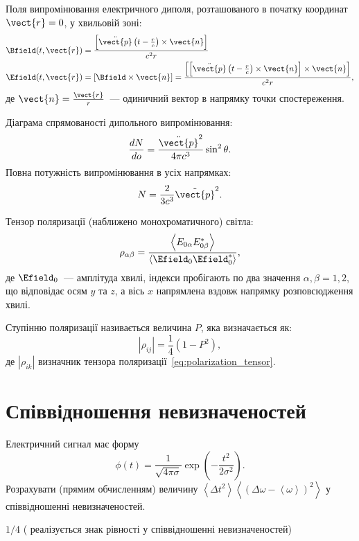 \begin{Theory}
	Поля випромінювання електричного диполя, розташованого в початку координат $\vect{r} = 0$, у хвильовій зоні:
	\begin{align}\label{eq:dipole_radiation}
		\Bfield(t, \vect{r}) & = \frac{\left[ \ddot{\vect{p}}\left(t - \frac{r}{c}\right)\times \vect{n}\right] }{c^2 r}                                                                       \\
		\Efield(t, \vect{r}) & = \left[ \Bfield \times\vect{n}\right] = \frac{\left[ \left[ \ddot{\vect{p}}\left(t - \frac{r}{c}\right)\times \vect{n}\right]\times \vect{n}\right]  }{c^2 r},
	\end{align}
	де $\vect{n} = \frac{\vect{r}}{r}$~--- одиничний вектор в напрямку точки спостереження.

	Діаграма спрямованості дипольного випромінювання:
	\begin{equation}\label{eq:diagram_direction}
		\frac{dN}{do} = \frac{\ddot{\vect{p}}^2}{4\pi c^3}\sin^2\theta.
	\end{equation}
	Повна потужність випромінювання  в усіх напрямках:
	\begin{equation}\label{eq:power}
		N = \frac{2}{3c^3}\ddot{\vect{p}}^2.
	\end{equation}

	Тензор поляризації (наближено монохроматичного) світла:
	\begin{equation}\label{eq:polarization_tensor}
		\rho_{\alpha\beta} = \frac{\left\langle E_{0\alpha} E_{0\beta}^* \right\rangle }{\left\langle \Efield_0\Efield^*_0\right\rangle },
	\end{equation}
	де $\Efield_0$~--- амплітуда хвилі, індекси пробігають по два значення $\alpha,\beta = 1,2$, що відповідає осям $y$ та $z$, а вісь $x$ напрямлена вздовж напрямку розповсюдження хвилі.

	Ступінню поляризації називається величина $P$, яка визначається як:
	\begin{equation}\label{eq:polarization_lewel}
		|\rho_{ij}| = \frac14(1 - P^2),
	\end{equation}
	де $|\rho_{ik}|$ визначник тензора поляризації~\eqref{eq:polarization_tensor}.
\end{Theory}




\section{Співвідношення невизначеностей}

\begin{problem}
Електричний сигнал має форму
\[
	\phi(t) = \frac{1}{\sqrt{4\pi\sigma}} \exp\left( -\frac{t^2}{2\sigma^2}\right).
\]
Розрахувати (прямим обчисленням) величину $\left\langle \Delta t^2 \right\rangle \left\langle \left(\Delta \omega  - \left\langle \omega  \right\rangle\right)^2 \right\rangle$  у співвідношенні невизначеностей.
\begin{solution}
	$1/4$ ( реалізується знак рівності у співвідношенні невизначеностей)
\end{solution}
\end{problem}


